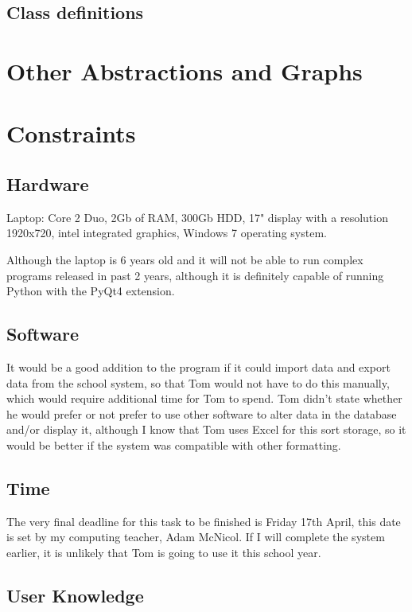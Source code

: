 \subsection{Class definitions}

\section{Other Abstractions and Graphs}

\section{Constraints}

\subsection{Hardware}
Laptop: Core 2 Duo, 2Gb of RAM, 300Gb HDD, 17" display with a resolution 1920x720, intel integrated graphics, Windows 7 operating system.

Although the laptop is 6 years old and it will not be able to run complex programs released in past 2 years, although it is definitely capable of running Python with the PyQt4 extension.

\subsection{Software}

It would be a good addition to the program if it could import data and export data from the school system, so that Tom would not have to do this manually, which would require additional time for Tom to spend. Tom didn't state whether he would prefer or not prefer to use other software to alter data in the database and/or display it, although I know that Tom uses Excel for this sort storage, so it would be better if the system was compatible with other formatting.


\subsection{Time}
The very final deadline for this task to be finished is Friday 17th April, this date is set by my computing teacher, Adam McNicol. If I will complete the system earlier, it is unlikely that Tom is going to use it this school year. 

\subsection{User Knowledge}

